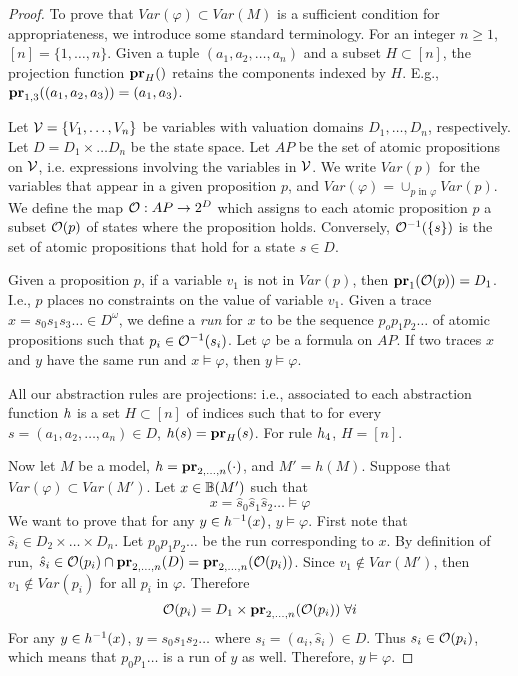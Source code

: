 \begin{proof}
	\newcommand{\hs}{\hat{s}}
	To prove that $Var(\varphi) \subset Var(M)$ is a sufficient condition for appropriateness, we introduce some standard terminology.
	For an integer $n \geq 1$, $[n] = \{1,\ldots,n\}$.
	Given a tuple $(a_1,a_2,\ldots,a_n)$ and a subset $H \subset [n]$, the projection function $\proj{}{H}$ retains the components indexed by $H$. E.g., $\proj{(a_1,a_2,a_3)}{1,3} = (a_1,a_3)$.
	
	Let $\Vc = \{V_1,\ldots, V_n\}$ be variables with valuation domains $D_1,\ldots,D_n$, respectively. 
	Let $D = D_1 \times \ldots D_n$ be the state space.
	Let $AP$ be the set of atomic propositions on $\Vc$, i.e. expressions involving the variables in $\Vc$.
	We write $Var(p)$ for the variables that appear in a given proposition $p$, and $Var(\varphi) = \cup_{p \textrm{ in } \varphi} Var(p)$.
	We define the map $\Oc: AP \rightarrow 2^D$ which assigns to each atomic proposition $p$ a subset $\Oc(p)$ of states where the proposition holds.
	Conversely, $\Oc^{-1}(\{s\})$ is the set of atomic propositions that hold for a state $s \in D$.

	Given a proposition $p$, if a variable $v_1$ is not in $Var(p)$, then $\proj{\Oc(p)}{1} = D_1$.
	I.e., $p$ places no constraints on the value of variable $v_1$.
	Given a trace $x = s_0 s_1 s_3 \ldots \in D^\omega$, we define a \emph{run} for $x$ to be the sequence $p_o p_1 p_2 \ldots$ of atomic propositions such that $p_i \in \Oc^{-1}(s_i)$.
	Let $\varphi$ be a formula on $AP$.
	If two traces $x$ and $y$ have the same run and $x \models \varphi$, then $y \models \varphi$.
	
	All our abstraction rules are projections: i.e., associated to each abstraction function $\absfun$ is a set $H \subset [n]$ of indices such that to for every $s = (a_1,a_2,\ldots,a_n) \in D$, $h(s) = \proj{s}{H}$.
	For rule $\absfun_4$, $H = [n]$.
	
	Now let $M$ be a model, 
	$\absfun = \proj{\cdot}{2,\ldots,n}$, and $M' = h(M)$.
	Suppose that $Var(\varphi) \subset Var(M')$.
	Let $x \in \beh(M')$ such that
	\[x = \hs_0 \hs_1 \hs_2 \ldots \models \varphi\] 
	We want to prove that for any $y \in \absfun^{-1}(x)$, $y \models \varphi$.
	First note that $\hs_i \in D_2 \times \ldots \times D_n$.
	Let $p_0 p_1 p_2 \ldots$ be the run corresponding to $x$.
	By definition of run,
	 $\hs_i \in \Oc(p_i) \cap \proj{D}{2,\ldots,n} = \proj{\Oc(p_i)}{2,\ldots,n}$.
	Since $v_1 \notin Var(M')$, then $v_1 \notin Var(p_i)$ for all $p_i$ in $\varphi$.
	Therefore 
	\[\Oc(p_i) = D_1 \times \proj{\Oc(p_i)}{2,\ldots,n}\; \forall i\]
	For any $y \in \absfun^{-1}(x)$, $y = s_0 s_1 s_2 \ldots$ where $s_i = (a_i, \hs_i) \in D$.
	Thus $s_i \in \Oc(p_i)$, which means that $p_0 p_1 \ldots$ is a run of $y$ as well.
	Therefore, $y \models \varphi$.
	
	
	
	
	\end{proof}
	